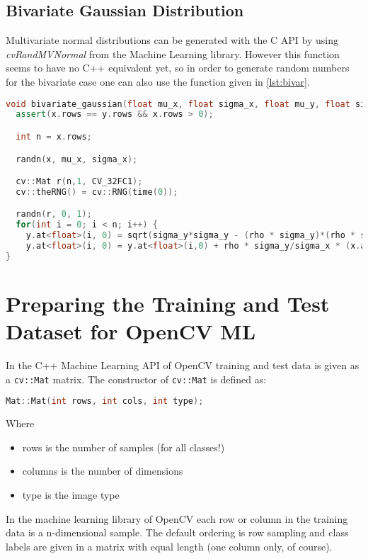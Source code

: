 \subsection{Bivariate Gaussian Distribution}

Multivariate normal distributions can be generated with the C API by using \textit{cvRandMVNormal} from the Machine Learning library. However this function seems to have no C++ equivalent yet, so in order to generate random numbers for the bivariate case one can also use the function given in \ref{lst:bivar}.

\begin{lstlisting}[language=C++, caption=bivariate\_gaussian dstribution, label=lst:bivar]
void bivariate_gaussian(float mu_x, float sigma_x, float mu_y, float sigma_y, float rho, cv::Mat &x, cv::Mat &y) {
  assert(x.rows == y.rows && x.rows > 0);

  int n = x.rows;

  randn(x, mu_x, sigma_x);

  cv::Mat r(n,1, CV_32FC1);
  cv::theRNG() = cv::RNG(time(0));

  randn(r, 0, 1);
  for(int i = 0; i < n; i++) {
    y.at<float>(i, 0) = sqrt(sigma_y*sigma_y - (rho * sigma_y)*(rho * sigma_y)) * r.at<float>(i, 0) + mu_y;
    y.at<float>(i, 0) = y.at<float>(i,0) + rho * sigma_y/sigma_x * (x.at<float>(i,0) - mu_x);
}
\end{lstlisting}


\section{Preparing the Training and Test Dataset for OpenCV ML}
In the C++ Machine Learning API of OpenCV training and test data is given as a \lstinline|cv::Mat| matrix. The constructor of \lstinline|cv::Mat| is defined as:
\begin{lstlisting}[language=C++]
Mat::Mat(int rows, int cols, int type);
\end{lstlisting}
Where
\begin{itemize}
 \item rows is the number of samples (for all classes!)
 \item columns is the number of dimensions
 \item type is the image type
\end{itemize}

In the machine learning library of OpenCV each row or column in the training data is a n-dimensional sample. The default ordering is row sampling and class labels are given in a matrix with equal length (one column only, of course). 


